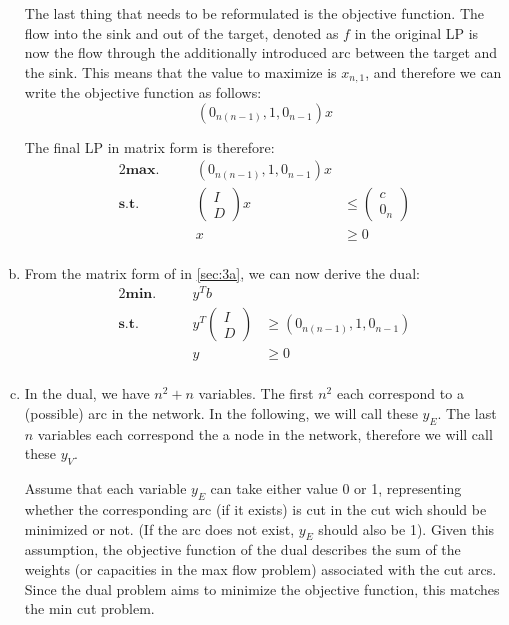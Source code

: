 \documentclass[a4paper,12pt,headsepline]{scrartcl}
\begin{document}
\begin{enumerate}[a)]
    The last thing that needs to be reformulated is the objective function.
    The flow into the sink and out of the target, denoted as $f$ in the original LP is now the flow through the additionally introduced arc between the target and the sink.
    This means that the value to maximize is $x_{n,1}$, and therefore we can write the objective function as follows:
    \[ (0_{n(n-1)},1,0_{n-1})x \]

    The final LP in matrix form is therefore:
    \begin{alignat*}{2}
      \textbf{max.}\quad && (0_{n(n-1)},1,0_{n-1})x & \\
      \textbf{s.t.}\quad && \begin{pmatrix}I\\D\end{pmatrix}x &\le \begin{pmatrix}c\\0_n\end{pmatrix} \\
                         && x &\ge 0 \\
    \end{alignat*}
  \item From the matrix form of in \ref{sec:3a}, we can now derive the dual:
    \begin{alignat*}{2}
      \textbf{min.}\quad && y^Tb & \\
      \textbf{s.t.}\quad && y^T\begin{pmatrix}I\\D\end{pmatrix} &\ge (0_{n(n-1)},1,0_{n-1}) \\
                         && y &\ge 0 \\
    \end{alignat*}
    \item In the dual, we have $n^2+n$ variables.
    The first $n^2$ each correspond to a (possible) arc in the network.
    In the following, we will call these $y_E$.
    The last $n$ variables each correspond the a node in the network, therefore we will call these $y_V$.

    Assume that each variable $y_E$ can take either value 0 or 1, representing whether the corresponding arc (if it exists) is cut in the cut wich should be minimized or not. (If the arc does not exist, $y_E$ should also be 1).
    Given this assumption, the objective function of the dual describes the sum of the weights (or capacities in the max flow problem) associated with the cut arcs.
    Since the dual problem aims to minimize the objective function, this matches the min cut problem.


\end{enumerate}
\end{document}
